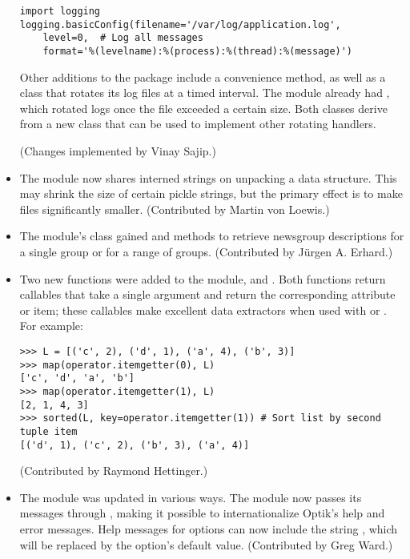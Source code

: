 \documentclass{howto}
\begin{document}
\begin{itemize}
\begin{verbatim}
import logging
logging.basicConfig(filename='/var/log/application.log',
    level=0,  # Log all messages
    format='%(levelname):%(process):%(thread):%(message)')	            
\end{verbatim}

Other additions to the  package include a
 convenience method, as well as a
 class that rotates its log files at a
timed interval.  The module already had ,
which rotated logs once the file exceeded a certain size.  Both
classes derive from a new  class that can
be used to implement other rotating handlers.

(Changes implemented by Vinay Sajip.)

\item The  module now shares interned strings on unpacking a 
data structure.  This may shrink the size of certain pickle strings,
but the primary effect is to make  files significantly smaller.
(Contributed by Martin von Loewis.)

\item The  module's  class gained
 and  methods to retrieve 
newsgroup descriptions for a single group or for a range of groups.
(Contributed by J\"urgen A. Erhard.)

\item Two new functions were added to the  module, 
 and .
Both functions return callables that take a single argument and return
the corresponding attribute or item; these callables make excellent
data extractors when used with  or
.  For example:

\begin{verbatim}
>>> L = [('c', 2), ('d', 1), ('a', 4), ('b', 3)]
>>> map(operator.itemgetter(0), L)
['c', 'd', 'a', 'b']
>>> map(operator.itemgetter(1), L)
[2, 1, 4, 3]
>>> sorted(L, key=operator.itemgetter(1)) # Sort list by second tuple item
[('d', 1), ('c', 2), ('b', 3), ('a', 4)]
\end{verbatim}

(Contributed by Raymond Hettinger.)       

\item The  module was updated in various ways.  The
module now passes its messages through ,
making it possible to internationalize Optik's help and error
messages.  Help messages for options can now include the string
, which will be replaced by the option's default
value.  (Contributed by Greg Ward.)


\end{itemize}
\end{document}
